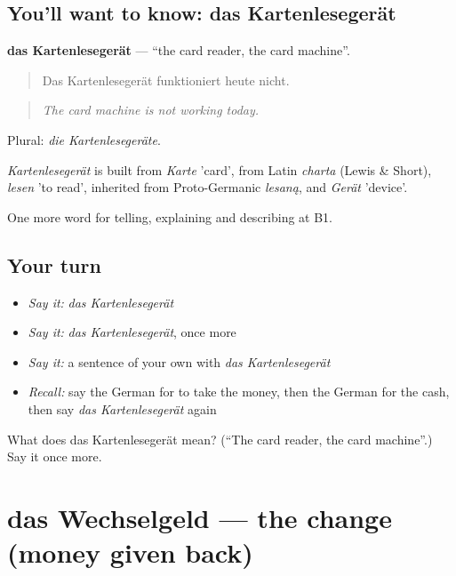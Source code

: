 \subsection*{You'll want to know: das Kartenlesegerät}
\textbf{das Kartenlesegerät} — \textquotedblleft{}the card reader, the card machine\textquotedblright{}.

\begin{quote}
Das Kartenlesegerät funktioniert heute nicht.
\end{quote}

\begin{quote}
\emph{The card machine is not working today.}
\end{quote}

Plural: \emph{die Kartenlesegeräte}.

\begin{cousinweb}
\emph{Kartenlesegerät} is built from \emph{Karte} 'card', from Latin \emph{charta} (Lewis \& Short), \emph{lesen} 'to read', inherited from Proto-Germanic \emph{lesaną}, and \emph{Gerät} 'device'.
\end{cousinweb}

\begin{grammarlens}[title={What you've built}]
One more word for telling, explaining and describing at B1.
\end{grammarlens}

\subsection*{Your turn}
\begin{itemize}
\raggedright
  \item \emph{Say it:} \emph{das Kartenlesegerät}
  \item \emph{Say it:} \emph{das Kartenlesegerät}, once more
  \item \emph{Say it:} a sentence of your own with \emph{das Kartenlesegerät}
  \item \emph{Recall:} say the German for to take the money, then the German for the cash, then say \emph{das Kartenlesegerät} again
\end{itemize}

\begin{tcolorbox}[breakable,colback=teal!4,colframe=teal!35!black,title={Before you move on}]
What does das Kartenlesegerät mean? (\textquotedblleft{}The card reader, the card machine\textquotedblright{}.) Say it once more.
\end{tcolorbox}
\section[das Wechselgeld]{das Wechselgeld — the change (money given back)}

